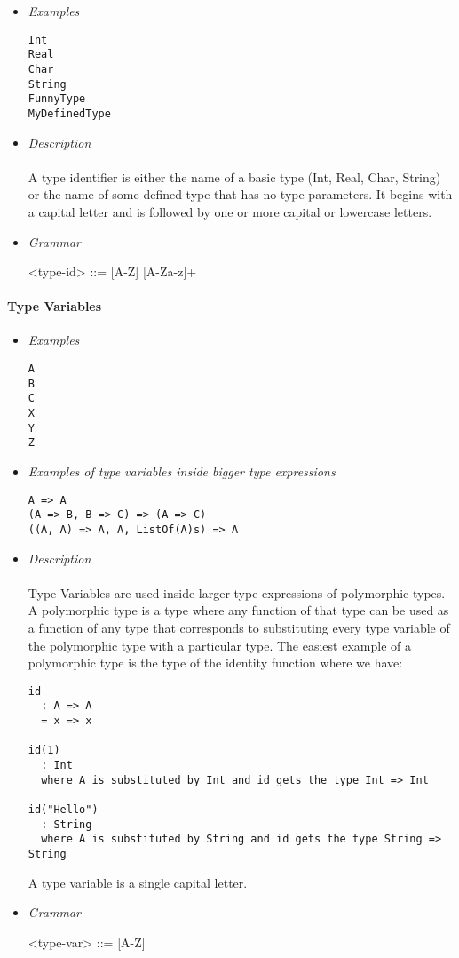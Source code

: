\documentclass{article}
\begin{document}
\begin{itemize}
\item \textit{Examples}
\begin{verbatim}
Int
Real 
Char 
String
FunnyType
MyDefinedType
\end{verbatim}

\item \textit{Description} \\\\
A type identifier is either the name of a basic type (Int, Real, Char, String) or
the name of some defined type that has no type parameters. It begins with a capital
letter and is followed by one or more capital or lowercase letters.

\item \textit{Grammar}
\begin{grammar}
<type-id> ::= [A-Z] [A-Za-z]+ \\ 
\end{grammar}
\end{itemize}

\paragraph{Type Variables}

\begin{itemize}
\item \textit{Examples}
\begin{verbatim}
A
B
C
X 
Y
Z
\end{verbatim}

\item \textit{Examples of type variables inside bigger type expressions}
\begin{verbatim}
A => A
(A => B, B => C) => (A => C)
((A, A) => A, A, ListOf(A)s) => A
\end{verbatim}

\item \textit{Description} \\\\
Type Variables are used inside larger type expressions of polymorphic types. A
polymorphic type is a type where any function of that type can be used as a
function of any type that corresponds to substituting every type variable of
the polymorphic type with a particular type. The easiest example of a
polymorphic type is the type of the identity function where we have:
\begin{verbatim}
id
  : A => A
  = x => x

id(1)
  : Int
  where A is substituted by Int and id gets the type Int => Int

id("Hello")
  : String
  where A is substituted by String and id gets the type String => String
\end{verbatim}

A type variable is a single capital letter.

\item \textit{Grammar}
\begin{grammar}
<type-var> ::= [A-Z] \\ 
\end{grammar}
\end{itemize}
\end{document}
